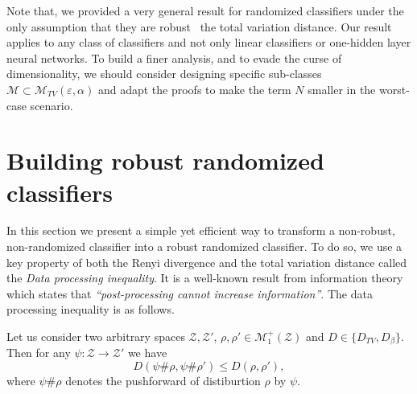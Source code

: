 \begin{rmq}
Note that, we provided a very general result for randomized classifiers under the only assumption that they are robust \wrt~the total variation distance. Our result applies to any class of classifiers and not only linear classifiers or  one-hidden layer neural networks. To build a finer analysis, and to evade the curse of dimensionality, we should consider designing specific sub-classes $\mathcal{M} \subset \mathcal{M}_{TV}\left(\varepsilon,\alpha\right)$ and adapt the proofs to make the term $N$ smaller in the worst-case scenario.  
\end{rmq}


\section{Building robust randomized classifiers} 
\label{section::Noisescheme}
In this section we present a simple yet efficient way to transform a non-robust, non-randomized classifier into a robust randomized classifier. To do so, we use a key property of both the Renyi divergence and the total variation distance called the \textit{Data processing inequality}. It is a well-known result from information theory which states that \textit{``post-processing cannot increase information''}. The data processing inequality is as follows. 
\begin{thm}
\label{th::Dataprocessing}
Let us consider two arbitrary spaces $\mathcal{Z}, \mathcal{Z}'$, $\rho,\rho' \in \mathcal{M}^+_1\left( \mathcal{Z} \right)$ and $D \in \{D_{TV},D_{\beta}\}$. Then for any $\psi : \mathcal{Z} \rightarrow \mathcal{Z}'$ we have 
$$  D\left( \psi \#\rho, \psi \#\rho' \right) \leq D\left( \rho,\rho' \right),$$
where $\psi \#\rho$ denotes the pushforward of distiburtion $\rho$ by $\psi$.
\end{thm}

